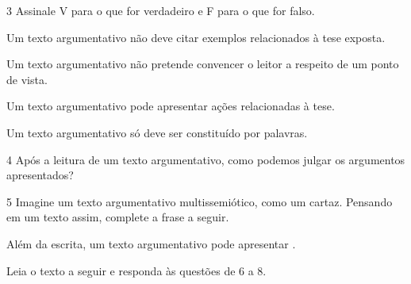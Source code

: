 \num{3} Assinale V para o que for verdadeiro e F para o que for falso.

\begin{boxlist}
\item Um texto argumentativo não deve citar exemplos relacionados à tese exposta. 

\item Um texto argumentativo não pretende convencer o leitor a respeito de 
um ponto de vista. 

\item Um texto argumentativo pode apresentar ações relacionadas à tese.  

\item Um texto argumentativo só deve ser constituído por palavras. 
\end{boxlist}

\num{4} Após a leitura de um texto argumentativo, como podemos julgar os argumentos apresentados?



\num{5} Imagine um texto argumentativo multissemiótico, como um cartaz. Pensando em um texto assim, complete a frase a seguir.

Além da escrita, um texto argumentativo pode apresentar \preencher. 

Leia o texto a seguir e responda às questões de 6 a 8.

